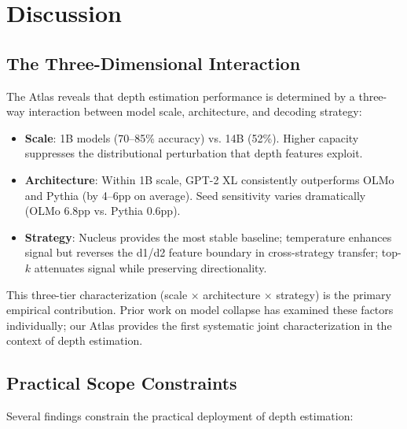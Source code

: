 \documentclass[11pt,a4paper]{article}
\begin{document}
\section{Discussion}

\subsection{The Three-Dimensional Interaction}

The Atlas reveals that depth estimation performance is determined by a three-way interaction between model scale, architecture, and decoding strategy:

\begin{itemize}[nosep]
    \item \textbf{Scale}: 1B models (70--85\% accuracy) vs. 14B (52\%). Higher capacity suppresses the distributional perturbation that depth features exploit.
    \item \textbf{Architecture}: Within 1B scale, GPT-2 XL consistently outperforms OLMo and Pythia (by 4--6pp on average). Seed sensitivity varies dramatically (OLMo 6.8pp vs. Pythia 0.6pp).
    \item \textbf{Strategy}: Nucleus provides the most stable baseline; temperature enhances signal but reverses the d1/d2 feature boundary in cross-strategy transfer; top-$k$ attenuates signal while preserving directionality.
\end{itemize}

This three-tier characterization (scale $\times$ architecture $\times$ strategy) is the primary empirical contribution. Prior work on model collapse has examined these factors individually; our Atlas provides the first systematic joint characterization in the context of depth estimation.

\subsection{Practical Scope Constraints}

Several findings constrain the practical deployment of depth estimation:
\end{document}
